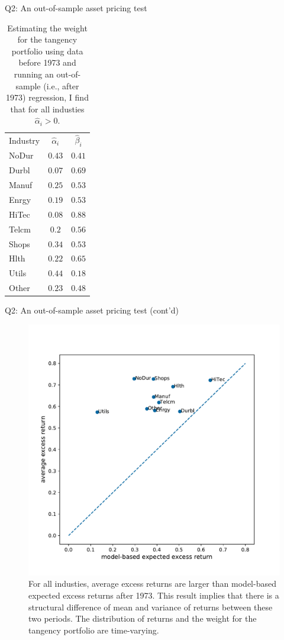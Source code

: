 \documentclass[10pt,t]{beamer}
\begin{document}
\begin{frame}{Q2: An out-of-sample asset pricing test}
\begin{table}
\begin{tabular}{lcc}
\toprule
Industry & $\hat{\alpha}_i$ & $\hat{\beta}_i$ \\
\cmidrule{1-3}
NoDur & $0.43$ & $0.41$\\
Durbl & $0.07$ & $0.69$\\
Manuf & $0.25$ & $0.53$\\
Enrgy & $0.19$ & $0.53$\\
HiTec & $0.08$ & $0.88$\\
Telcm & $0.2$ & $0.56$\\
Shops & $0.34$ & $0.53$\\
Hlth & $0.22$ & $0.65$\\
Utils & $0.44$ & $0.18$\\
Other & $0.23$ & $0.48$\\
\bottomrule
\end{tabular}
\caption{Estimating the weight for the tangency portfolio using data before 1973 and running an out-of-sample (i.e., after 1973) regression, I find that for all industies $\hat{\alpha}_i > 0$.}
\end{table}
\end{frame}

\begin{frame}{Q2: An out-of-sample asset pricing test (cont'd)}
\begin{figure}[h!]
\centering
\includegraphics[width=0.5\linewidth]{q2fig5.pdf}
\caption{For all industies, average excess returns are larger than model-based expected excess returns after 1973. This result implies that there is a structural difference of mean and variance of returns between these two periods. The distribution of returns and the weight for the tangency portfolio are time-varying.}
\end{figure}
\end{frame}
\end{document}
